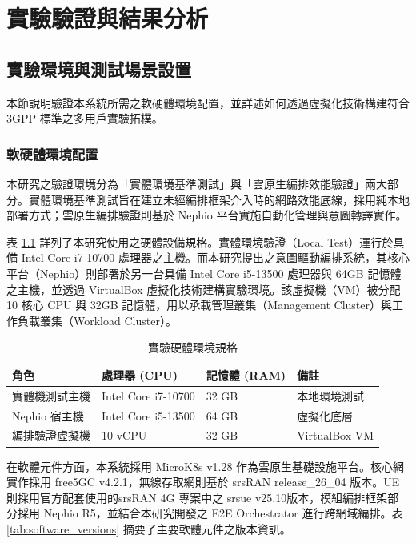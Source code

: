 \chapter{實驗驗證與結果分析}
\label{ch:evaluation}

\section{實驗環境與測試場景設置}
\label{sec:exp_setup}
本節說明驗證本系統所需之軟硬體環境配置，並詳述如何透過虛擬化技術構建符合 3GPP 標準之多用戶實驗拓樸。

\subsection{軟硬體環境配置}
\label{subsec:exp_environment}

本研究之驗證環境分為「實體環境基準測試」與「雲原生編排效能驗證」兩大部分。實體環境基準測試旨在建立未經編排框架介入時的網路效能底線，採用純本地部署方式；雲原生編排驗證則基於 Nephio 平台實施自動化管理與意圖轉譯實作。

表 \ref{tab:hardware_specs} 詳列了本研究使用之硬體設備規格。實體環境驗證（Local Test）運行於具備 Intel Core i7-10700 處理器之主機。而本研究提出之意圖驅動編排系統，其核心平台（Nephio）則部署於另一台具備 Intel Core i5-13500 處理器與 64GB 記憶體之主機，並透過 VirtualBox 虛擬化技術建構實驗環境。該虛擬機（VM）被分配 10 核心 CPU 與 32GB 記憶體，用以承載管理叢集（Management Cluster）與工作負載叢集（Workload Cluster）。

\begin{table}[htbp]
    \centering
    \caption{實驗硬體環境規格}
    \label{tab:hardware_specs}
    \begin{tabular}{|l|l|l|l|}
    \hline
    \textbf{角色} & \textbf{處理器 (CPU)} & \textbf{記憶體 (RAM)} & \textbf{備註} \\ \hline
    實體機測試主機 & Intel Core i7-10700 & 32 GB & 本地環境測試 \\ \hline
    Nephio 宿主機 & Intel Core i5-13500 & 64 GB & 虛擬化底層 \\ \hline
    編排驗證虛擬機 & 10 vCPU & 32 GB & VirtualBox VM \\ \hline
    \end{tabular}
\end{table}

在軟體元件方面，本系統採用 MicroK8s v1.28 作為雲原生基礎設施平台。核心網實作採用 free5GC v4.2.1，無線存取網則基於 srsRAN release\_26\_04 版本。UE則採用官方配套使用的srsRAN 4G 專案中之 srsue v25.10版本，模組編排框架部分採用 Nephio R5，並結合本研究開發之 E2E Orchestrator 進行跨網域編排。表 \ref{tab:software_versions} 摘要了主要軟體元件之版本資訊。

